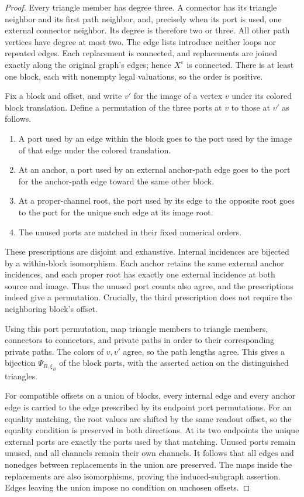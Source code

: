 \documentclass[11pt]{article}
\theoremstyle{definition}
\newcommand{\eps}{\varepsilon}
\begin{document}
\begin{proof}
Every triangle member has degree three.
A connector has its triangle neighbor and its first path neighbor,
and, precisely when its port is used, one external connector neighbor.
Its degree is therefore two or three.
All other path vertices have degree at most two.
The edge lists introduce neither loops nor repeated edges.
Each replacement is connected, and replacements are joined exactly
along the original graph's edges; hence \(X^\eps\) is connected.
There is at least one block, each with nonempty legal valuations,
so the order is positive.

Fix a block and offset, and write \(v'\) for the image of a vertex
\(v\) under its colored block translation.
Define a permutation of the three ports at \(v\) to those at \(v'\)
as follows.
\begin{enumerate}
\item
A port used by an edge within the block goes to the port used by the
image of that edge under the colored translation.
\item
At an anchor, a port used by an external anchor-path edge goes to the
port for the anchor-path edge toward the same other block.
\item
At a proper-channel root, the port used by its edge to the opposite
root goes to the port for the unique such edge at its image root.
\item
The unused ports are matched in their fixed numerical orders.
\end{enumerate}
These prescriptions are disjoint and exhaustive.
Internal incidences are bijected by a within-block isomorphism.
Each anchor retains the same external anchor incidences, and each
proper root has exactly one external incidence at both source and
image.  Thus the unused port counts also agree, and the prescriptions
indeed give a permutation.
Crucially, the third prescription does not require the neighboring
block's offset.

Using this port permutation, map triangle members to triangle members,
connectors to connectors, and private paths in order to their
corresponding private paths.  The colors of \(v,v'\) agree, so the
path lengths agree.  This gives a bijection
\(\Psi_{B,\xi_B}\) of the block parts, with the asserted action on the
distinguished triangles.

For compatible offsets on a union of blocks, every internal edge and
every anchor edge is carried to the edge prescribed by its endpoint
port permutations.
For an equality matching, the root values are shifted by the same
readout offset, so the equality condition is preserved in both
directions.  At its two endpoints the unique external ports are
exactly the ports used by that matching.
Unused ports remain unused, and all channels remain their own channels.
It follows that all edges and nonedges between replacements in the
union are preserved.  The maps inside the replacements are also
isomorphisms, proving the induced-subgraph assertion.
Edges leaving the union impose no condition on unchosen offsets.


\end{proof}
\end{document}
